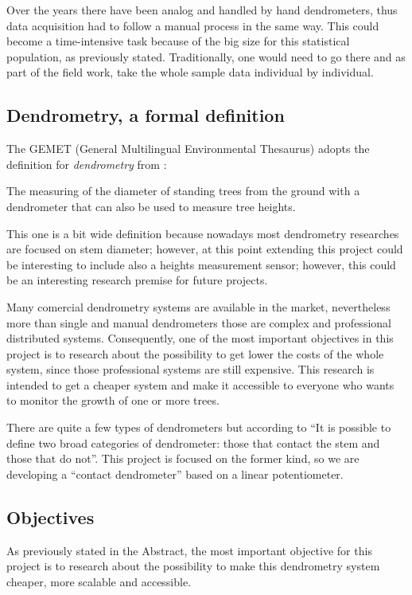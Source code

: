 \documentclass[11pt,a4paper,dvipsnames,twoside]{article}
\begin{document}
Over the years there have been analog and handled by hand dendrometers, thus data acquisition had to follow a manual process in the same way. This could become a time-intensive task because of the big size for this statistical population, as previously stated. Traditionally, one would need to go there and as part of the field work, take the whole sample data individual by individual.

\subsection{Dendrometry, a formal definition}
The GEMET (General Multilingual Environmental Thesaurus) adopts the definition for \textit{dendrometry} from \cite{DictNaturalRes}:

\begin{quoting}
  The measuring of the diameter of standing trees from the ground with a dendrometer that can also be used to measure tree heights.
\end{quoting}

This one is a bit wide definition because nowadays most dendrometry researches are focused on stem diameter; however, at this point extending this project could be interesting to include also a heights measurement sensor; however, this could be an interesting research premise for future projects.

Many comercial dendrometry systems are available in the market, nevertheless more than single and manual dendrometers those are complex and professional distributed systems. Consequently, one of the most important objectives in this project is to research about the possibility to get lower the costs of the whole system, since those professional systems are still expensive. This research is intended to get a cheaper system and make it accessible to everyone who wants to monitor the growth of one or more trees. 

There are quite a few types of dendrometers but according to \cite{DendroResearch} \enquote{It is possible to define two broad categories of dendrometer: those that contact the stem and those that do not}. This project is focused on the former kind, so we are developing a \enquote{contact dendrometer} based on a linear potentiometer.

\subsection{Objectives}
As previously stated in the Abstract, the most important objective for this project is to research about the possibility to make this dendrometry system cheaper, more scalable and accessible.
\end{document}
